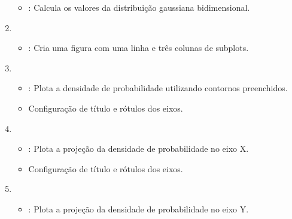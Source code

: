 \documentclass[letterpaper,10pt,english]{jupyterBook}
\begin{document}
\begin{enumerate}
\begin{itemize}
\item {} 
\sphinxAtStartPar
{}: Calcula os valores da distribuição gaussiana bidimensional.

\end{itemize}

\item {} 
\sphinxAtStartPar
{}
\begin{itemize}
\item {} 
\sphinxAtStartPar
{}: Cria uma figura com uma linha e três colunas de subplots.

\end{itemize}

\item {} 
\sphinxAtStartPar
{}
\begin{itemize}
\item {} 
\sphinxAtStartPar
{}: Plota a densidade de probabilidade utilizando contornos preenchidos.

\item {} 
\sphinxAtStartPar
Configuração de título e rótulos dos eixos.

\end{itemize}

\item {} 
\sphinxAtStartPar
{}
\begin{itemize}
\item {} 
\sphinxAtStartPar
{}: Plota a projeção da densidade de probabilidade no eixo X.

\item {} 
\sphinxAtStartPar
Configuração de título e rótulos dos eixos.

\end{itemize}

\item {} 
\sphinxAtStartPar
{}
\begin{itemize}
\item {} 
\sphinxAtStartPar
{}: Plota a projeção da densidade de probabilidade no eixo Y.


\end{itemize}
\end{enumerate}
\end{document}
